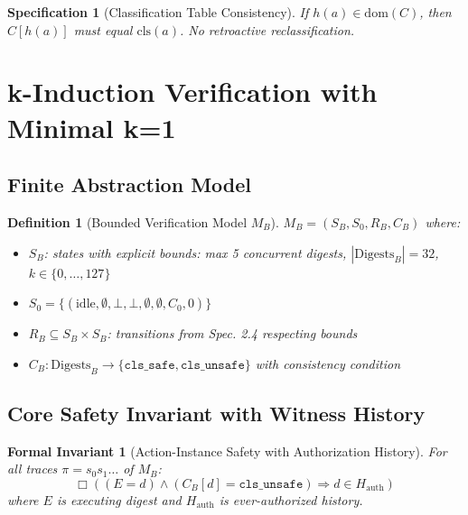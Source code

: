 \documentclass[12pt]{article}
\newtheorem{definition}{Definition}[section]
\newtheorem{spec}{Specification}[section]
\newtheorem{invariant}{Formal Invariant}[section]
\begin{document}
\begin{spec}[Classification Table Consistency]
If $h(a) \in \mathrm{dom}(C)$, then $C[h(a)]$ must equal $\mathrm{cls}(a)$. No retroactive reclassification.
\end{spec}

\section{k-Induction Verification with Minimal k=1}

\subsection{Finite Abstraction Model}

\begin{definition}[Bounded Verification Model $M_B$]
$M_B = (S_B, S_0, R_B, C_B)$ where:
\begin{itemize}
    \item $S_B$: states with explicit bounds: max 5 concurrent digests, $|\mathrm{Digests}_B| = 32$, $k \in \{0,\dots,127\}$
    \item $S_0 = \{(\text{idle}, \emptyset, \bot, \bot, \emptyset, \emptyset, C_0, 0)\}$
    \item $R_B \subseteq S_B \times S_B$: transitions from Spec. 2.4 respecting bounds
    \item $C_B: \mathrm{Digests}_B \to \{\texttt{cls\_safe}, \texttt{cls\_unsafe}\}$ with consistency condition
\end{itemize}
\end{definition}

\subsection{Core Safety Invariant with Witness History}

\begin{invariant}[Action-Instance Safety with Authorization History]
For all traces $\pi = s_0 s_1 \dots$ of $M_B$:
\[
\Box\left((E = d) \land (C_B[d] = \texttt{cls\_unsafe}) \Rightarrow d \in H_{\text{auth}}\right)
\]
where $E$ is executing digest and $H_{\text{auth}}$ is ever-authorized history.
\end{invariant}
\end{document}
